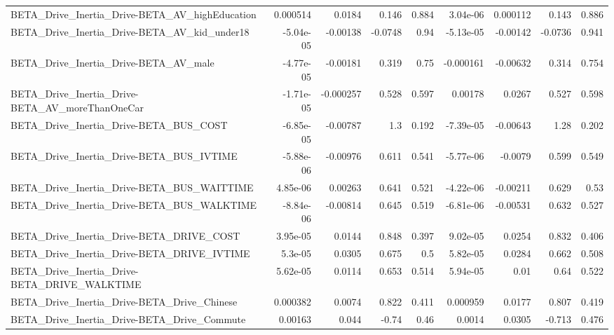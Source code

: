 \begin{tabular}{lrrrrrrrr}
BETA\_Drive\_Inertia\_Drive-BETA\_AV\_highEducation     &    0.000514 &       0.0184 &    0.146 &    0.884 &   3.04e-06 &    0.000112 &        0.143 &         0.886 \\
BETA\_Drive\_Inertia\_Drive-BETA\_AV\_kid\_under18       &   -5.04e-05 &     -0.00138 &  -0.0748 &     0.94 &  -5.13e-05 &    -0.00142 &      -0.0736 &         0.941 \\
BETA\_Drive\_Inertia\_Drive-BETA\_AV\_male              &   -4.77e-05 &     -0.00181 &    0.319 &     0.75 &  -0.000161 &    -0.00632 &        0.314 &         0.754 \\
BETA\_Drive\_Inertia\_Drive-BETA\_AV\_moreThanOneCar    &   -1.71e-05 &    -0.000257 &    0.528 &    0.597 &    0.00178 &      0.0267 &        0.527 &         0.598 \\
BETA\_Drive\_Inertia\_Drive-BETA\_BUS\_COST             &   -6.85e-05 &     -0.00787 &      1.3 &    0.192 &  -7.39e-05 &    -0.00643 &         1.28 &         0.202 \\
BETA\_Drive\_Inertia\_Drive-BETA\_BUS\_IVTIME           &   -5.88e-06 &     -0.00976 &    0.611 &    0.541 &  -5.77e-06 &     -0.0079 &        0.599 &         0.549 \\
BETA\_Drive\_Inertia\_Drive-BETA\_BUS\_WAITTIME         &    4.85e-06 &      0.00263 &    0.641 &    0.521 &  -4.22e-06 &    -0.00211 &        0.629 &          0.53 \\
BETA\_Drive\_Inertia\_Drive-BETA\_BUS\_WALKTIME         &   -8.84e-06 &     -0.00814 &    0.645 &    0.519 &  -6.81e-06 &    -0.00531 &        0.632 &         0.527 \\
BETA\_Drive\_Inertia\_Drive-BETA\_DRIVE\_COST           &    3.95e-05 &       0.0144 &    0.848 &    0.397 &   9.02e-05 &      0.0254 &        0.832 &         0.406 \\
BETA\_Drive\_Inertia\_Drive-BETA\_DRIVE\_IVTIME         &     5.3e-05 &       0.0305 &    0.675 &      0.5 &   5.82e-05 &      0.0284 &        0.662 &         0.508 \\
BETA\_Drive\_Inertia\_Drive-BETA\_DRIVE\_WALKTIME       &    5.62e-05 &       0.0114 &    0.653 &    0.514 &   5.94e-05 &        0.01 &         0.64 &         0.522 \\
BETA\_Drive\_Inertia\_Drive-BETA\_Drive\_Chinese        &    0.000382 &       0.0074 &    0.822 &    0.411 &   0.000959 &      0.0177 &        0.807 &         0.419 \\
BETA\_Drive\_Inertia\_Drive-BETA\_Drive\_Commute        &     0.00163 &        0.044 &    -0.74 &     0.46 &     0.0014 &      0.0305 &       -0.713 &         0.476 \\

\end{tabular}
